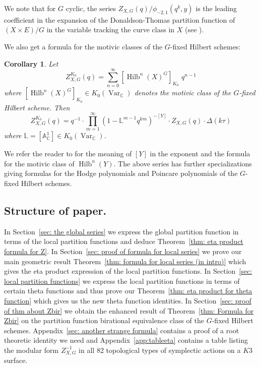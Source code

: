 \documentclass{amsart}
\newtheorem{corollary}[theorem]{Corollary}
\theoremstyle{definition}
\newcommand{\CC} {{\mathbb C}}          %
\newcommand{\LL}{\mathbb{L}}
\newcommand{\Hilb}{\operatorname{Hilb}}
\begin{document}
We note that for $G$ cyclic, the series
$Z_{X,G}(q)/\phi_{-2,1}(q^{k},y) $ is the leading coefficient in the
expansion of the Donaldson-Thomas partition function of $(X\times
E)/G$ in the variable tracking the curve class in $X$ (see
\cite[Thm~0.1]{bryan2018chl}).

We also get a formula for the motivic classes of the $G$-fixed Hilbert schemes:


\begin{corollary}\label{cor: ZK0 formula}
Let 
\[
Z^{K_{0}}_{X,G}(q) = \sum_{n=0}^{\infty} [\Hilb^{n}(X)^{G}]_{K_{0}}\,\, q^{n-1}
\]
where $ [\Hilb^{n}(X)^{G}]_{K_{0}}\in K_{0}(\operatorname{Var}_{\CC})$
denotes the motivic class of the $G$-fixed Hilbert scheme. Then
\[
Z^{K_{0}}_{X,G}(q) = q^{-1}\cdot \prod_{m=1}^{\infty} \left(1-\LL^{m-1}
q^{km} \right)^{-[Y]}  \cdot Z_{X,G}(q)\cdot \Delta (k\tau )
\]
where $\LL  = [\mathbb{A}^{1}_{\CC}]\in
K_{0}(\operatorname{Var}_{\CC})$.
\end{corollary}
We refer the reader to \cite{GZ-L-MH-power} for the meaning
of $[Y]$ in the exponent and the formula for the motivic class of
$\Hilb^{n}(Y)$. The above series has further specializations giving formulas for the  Hodge polynomials and
Poincare polynomials of the $G$-fixed Hilbert schemes.


\subsection{Structure of paper. }  In Section~\ref{sec: the global
series} we express the global partition function in terms of the local
partition functions and deduce Theorem~\ref{thm: eta product formula
for Z}. In Section~\ref{sec: proof of formula for local series} we
prove our main geometric result Theorem~\ref{thm: formula for local
series (in intro)} which gives the eta product expression of the local
partition functions. In Section~\ref{sec: local partition functions}
we express the local partition functions in terms of certain theta
functions and thus prove our Theorem~\ref{thm: eta product for theta
function} which gives us the new theta function identities. In
Section~\ref{sec: proof of thm about Zbir} we obtain the enhanced
result of Theorem~\ref{thm: Formula for Zbir} on the partition
function birational equivalence class of the $G$-fixed Hilbert
schemes. Appendix~\ref{sec: another strange formula} contains a proof
of a root theoretic identity we need and Appendix~\ref{app:tableeta}
contains a table listing the modular form $Z^{-1}_{X,G}$ in all 82
topological types of symplectic actions on a $K3$ surface.
\end{document}
